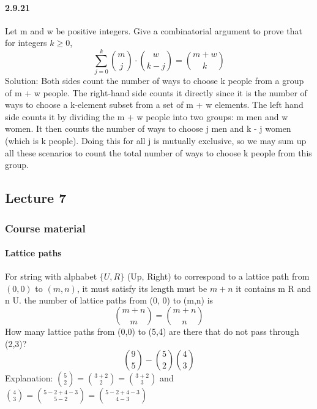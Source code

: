 \documentclass{article}
\begin{document}
\paragraph{2.9.21}
Let m and w be positive integers. Give a combinatorial argument to prove that for
integers $k \ge 0$,
$$\sum_{j=0}^{k}{\binom{m}{j}\cdot \binom{w}{k-j}}=\binom{m+w}{k}$$
Solution:\newline
Both sides count the number of ways to choose k people from a group of m + w people. The
right-hand side counts it directly since it is the number of ways to choose a k-element subset
from a set of m + w elements. The left hand side counts it by dividing the m + w people into
two groups: m men and w women. It then counts the number of ways to choose j men and
k - j women (which is k people). Doing this for all j is mutually exclusive, so we may sum
up all these scenarios to count the total number of ways to choose k people from this group.
\subsection{Lecture 7}
\subsubsection{Course material}
\paragraph{Lattice paths}
For string with alphabet $\{U, R\}$ (Up, Right) to correspond to a lattice
path from $(0, 0)$ to $(m, n)$, it must satisfy\newline
its length must be $m+n$ \newline
it contains m R and n U.\newline
the number of lattice paths from (0, 0) to (m,n) is $$\binom{m+n}{m}=\binom{m+n}{n}$$
How many lattice paths from (0,0) to (5,4) are there that do
not pass through (2,3)?
$$\binom{9}{5}-\binom{5}{2}\binom{4}{3}$$
Explanation: $\binom{5}{2}=\binom{3+2}{2}=\binom{3+2}{3}$ and $\binom{4}{3}=\binom{5-2+4-3}{5-2}=\binom{5-2+4-3}{4-3}$
\end{document}
